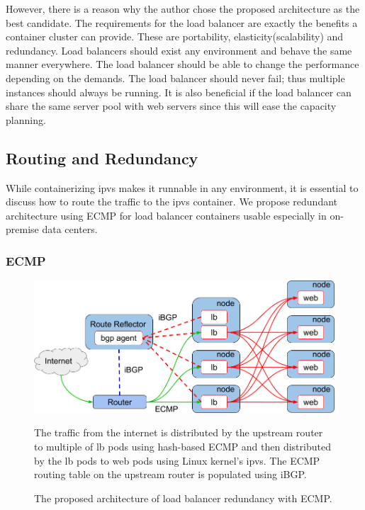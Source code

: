 However, there is a reason why the author chose the proposed architecture as the best candidate.
The requirements for the load balancer are exactly the benefits a container cluster can provide.
These are portability, elasticity(scalability) and redundancy.
Load balancers should exist any environment and behave the same manner everywhere.
The load balancer should be able to change the performance depending on the demands.
The load balancer should never fail; thus multiple instances should always be running.
It is also beneficial if the load balancer can share the same server pool with web servers since this will ease the capacity planning.

\subsection{Routing and Redundancy}\label{routing_redundancy}

While containerizing ipvs makes it runnable in any environment, it is essential to discuss how to route the traffic to the ipvs container.
We propose redundant architecture using ECMP for load balancer containers usable especially in on-premise data centers.

\subsubsection{ECMP}\label{sec:ecmp}

\begin{figure}[tb]
  \centering
  \includegraphics[width=0.8\columnwidth]{Figs/ecmp.png}
\caption{The proposed architecture of load balancer redundancy with ECMP.}

\vspace{1mm}

\begin{minipage}{0.9\columnwidth}
  The traffic from the internet is distributed by the upstream router to multiple of lb pods using hash-based ECMP and then distributed by the lb pods to web pods using Linux kernel's ipvs.
  The ECMP routing table on the upstream router is populated using iBGP.
\end{minipage}
\label{fig:ecmp}
\end{figure}

